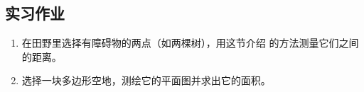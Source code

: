 \begin{solution}
    
\end{solution}










































































\subsection*{实习作业}
\begin{enumerate}
    \item 在田野里选择有障碍物的两点（如两棵树），用这节介绍
    的方法测量它们之间的距离。
    \item 选择一块多边形空地，测绘它的平面图并求出它的面积。
\end{enumerate}

